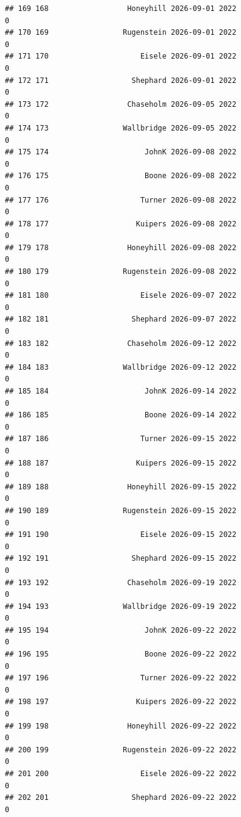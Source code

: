 \documentclass[
]{article}
\begin{document}
\begin{verbatim}
## 169 168                  Honeyhill 2026-09-01 2022                       0
## 170 169                 Rugenstein 2026-09-01 2022                       0
## 171 170                     Eisele 2026-09-01 2022                       0
## 172 171                   Shephard 2026-09-01 2022                       0
## 173 172                  Chaseholm 2026-09-05 2022                       0
## 174 173                 Wallbridge 2026-09-05 2022                       0
## 175 174                      JohnK 2026-09-08 2022                       0
## 176 175                      Boone 2026-09-08 2022                       0
## 177 176                     Turner 2026-09-08 2022                       0
## 178 177                    Kuipers 2026-09-08 2022                       0
## 179 178                  Honeyhill 2026-09-08 2022                       0
## 180 179                 Rugenstein 2026-09-08 2022                       0
## 181 180                     Eisele 2026-09-07 2022                       0
## 182 181                   Shephard 2026-09-07 2022                       0
## 183 182                  Chaseholm 2026-09-12 2022                       0
## 184 183                 Wallbridge 2026-09-12 2022                       0
## 185 184                      JohnK 2026-09-14 2022                       0
## 186 185                      Boone 2026-09-14 2022                       0
## 187 186                     Turner 2026-09-15 2022                       0
## 188 187                    Kuipers 2026-09-15 2022                       0
## 189 188                  Honeyhill 2026-09-15 2022                       0
## 190 189                 Rugenstein 2026-09-15 2022                       0
## 191 190                     Eisele 2026-09-15 2022                       0
## 192 191                   Shephard 2026-09-15 2022                       0
## 193 192                  Chaseholm 2026-09-19 2022                       0
## 194 193                 Wallbridge 2026-09-19 2022                       0
## 195 194                      JohnK 2026-09-22 2022                       0
## 196 195                      Boone 2026-09-22 2022                       0
## 197 196                     Turner 2026-09-22 2022                       0
## 198 197                    Kuipers 2026-09-22 2022                       0
## 199 198                  Honeyhill 2026-09-22 2022                       0
## 200 199                 Rugenstein 2026-09-22 2022                       0
## 201 200                     Eisele 2026-09-22 2022                       0
## 202 201                   Shephard 2026-09-22 2022                       0

\end{verbatim}
\end{document}
